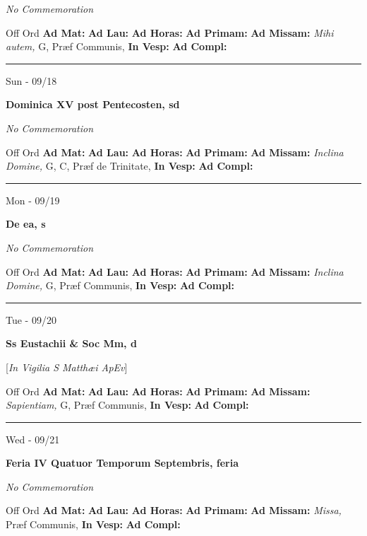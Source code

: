 \documentclass[letterpaper, 10pt]{article}
\begin{document}
\textit{No Commemoration}\begin{justify}
Off Ord
\textbf{Ad Mat: }
\textbf{Ad Lau: }
\textbf{Ad Horas: }
\textbf{Ad Primam: }
\textbf{Ad Missam:} \textit{Mihi autem, } G, Præf Communis, 
\textbf{In Vesp: }
\textbf{Ad Compl: }\end{justify}



\hrule
\begin{center}
Sun - 09/18
\end{center}\textbf{ \large Dominica XV post Pentecosten, \textnormal{\normalsize sd}}

\textit{No Commemoration}\begin{justify}
Off Ord
\textbf{Ad Mat: }
\textbf{Ad Lau: }
\textbf{Ad Horas: }
\textbf{Ad Primam: }
\textbf{Ad Missam:} \textit{Inclina Domine, } G, C, Præf de Trinitate, 
\textbf{In Vesp: }
\textbf{Ad Compl: }\end{justify}



\hrule
\begin{center}
Mon - 09/19
\end{center}\textbf{ \large De ea, \textnormal{\normalsize s}}

\textit{No Commemoration}\begin{justify}
Off Ord
\textbf{Ad Mat: }
\textbf{Ad Lau: }
\textbf{Ad Horas: }
\textbf{Ad Primam: }
\textbf{Ad Missam:} \textit{Inclina Domine, } G, Præf Communis, 
\textbf{In Vesp: }
\textbf{Ad Compl: }\end{justify}



\hrule
\begin{center}
Tue - 09/20
\end{center}\textbf{ \large Ss Eustachii \& Soc Mm, \textnormal{\normalsize d}}

[\textit{In Vigilia S Matthæi ApEv}]
\begin{justify}
Off Ord
\textbf{Ad Mat: }
\textbf{Ad Lau: }
\textbf{Ad Horas: }
\textbf{Ad Primam: }
\textbf{Ad Missam:} \textit{Sapientiam, } G, Præf Communis, 
\textbf{In Vesp: }
\textbf{Ad Compl: }\end{justify}



\hrule
\begin{center}
Wed - 09/21
\end{center}\textbf{ \large Feria IV Quatuor Temporum Septembris, \textnormal{\normalsize feria}}

\textit{No Commemoration}\begin{justify}
Off Ord
\textbf{Ad Mat: }
\textbf{Ad Lau: }
\textbf{Ad Horas: }
\textbf{Ad Primam: }
\textbf{Ad Missam:} \textit{Missa, } Præf Communis, 
\textbf{In Vesp: }
\textbf{Ad Compl: }\end{justify}
\end{document}
